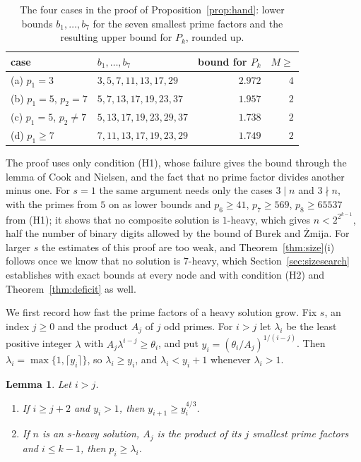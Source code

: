 \documentclass[11pt,reqno]{amsart}
\numberwithin{equation}{section}
\theoremstyle{plain}
\newtheorem{lemma}[theorem]{Lemma}
\theoremstyle{definition}
\theoremstyle{remark}
\begin{document}
\begin{table}[ht]
\centering
\caption{The four cases in the proof of Proposition~\ref{prop:hand}:
lower bounds $b_1,\dots,b_7$ for the seven smallest prime factors and
the resulting upper bound for $P_k$, rounded up.}
\label{tab:hand}
\smallskip
\small
\begin{tabular}{@{}llrr@{}}
\toprule
case & $b_1,\dots,b_7$ & bound for $P_k$ & $M\ge$ \\
\midrule
(a) $p_1=3$ & $3,5,7,11,13,17,29$ & $2.972$ & $4$ \\
(b) $p_1=5$, $p_2=7$ & $5,7,13,17,19,23,37$ & $1.957$ & $2$ \\
(c) $p_1=5$, $p_2\ne7$ & $5,13,17,19,23,29,37$ & $1.738$ & $2$ \\
(d) $p_1\ge7$ & $7,11,13,17,19,23,29$ & $1.749$ & $2$ \\
\bottomrule
\end{tabular}
\end{table}

The proof uses only condition (H1), whose failure gives the bound
through the lemma of Cook and Nielsen, and the fact that no prime
factor divides another minus one.
For $s=1$ the same argument needs only the cases $3\mid n$ and
$3\nmid n$, with the primes from $5$ on as lower bounds and
$p_6\ge41$, $p_7\ge569$, $p_8\ge65537$ from (H1); it shows that no
composite solution is $1$-heavy, which gives $n<2^{2^{k-1}}$, half the
number of binary digits allowed by the bound of Burek and \.Zmija. For larger $s$ the estimates of this proof
are too weak, and Theorem~\ref{thm:size}(i) follows once we know that
no solution is $7$-heavy, which Section~\ref{sec:sizesearch}
establishes with exact bounds at every node and with condition (H2)
and Theorem~\ref{thm:deficit} as well.

We first record how fast the prime factors of a heavy solution grow.
Fix $s$, an index $j\ge0$ and the product $A_j$ of $j$ odd primes. For
$i>j$ let $\lambda_i$ be the least positive integer $\lambda$ with
$A_j\lambda^{i-j}\ge\theta_i$, and put $y_i=(\theta_i/A_j)^{1/(i-j)}$.
Then $\lambda_i=\max\{1,\lceil y_i\rceil\}$, so $\lambda_i\ge y_i$,
and $\lambda_i<y_i+1$ whenever $\lambda_i>1$.

\begin{lemma}\label{lem:growth}
Let $i>j$.
\begin{enumerate}[label=\textup{(\roman*)}]
\item If $i\ge j+2$ and $y_i>1$, then $y_{i+1}\ge y_i^{4/3}$.
\item If $n$ is an $s$-heavy solution, $A_j$ is the product of its $j$
smallest prime factors and $i\le k-1$, then $p_i\ge\lambda_i$.
\end{enumerate}
\end{lemma}
\end{document}
